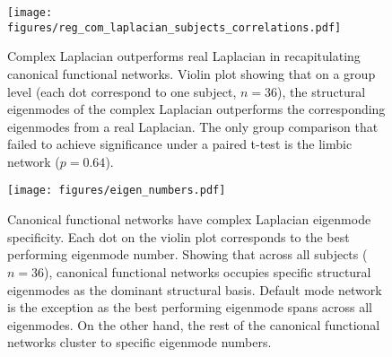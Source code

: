 \documentclass{article}
\begin{document}
\begin{figure}[ht]
\centering
\texttt{[image: figures/reg\_com\_laplacian\_subjects\_correlations.pdf]}
\caption{Complex Laplacian outperforms real Laplacian in recapitulating canonical functional networks. Violin plot showing that on a group level (each dot correspond to one subject, $n = 36$), the structural eigenmodes of the complex Laplacian outperforms the corresponding eigenmodes from a real Laplacian. The only group comparison that failed to achieve significance under a paired t-test is the limbic network ($p = 0.64$).}
\label{fig:fig7}
\end{figure}


\begin{figure}[ht]
\texttt{[image: figures/eigen\_numbers.pdf]}
\caption{Canonical functional networks have complex Laplacian eigenmode specificity. Each dot on the violin plot corresponds to the best performing eigenmode number. Showing that across all subjects ($n = 36$), canonical functional networks occupies specific structural eigenmodes as the dominant structural basis. Default mode network is the exception as the best performing eigenmode spans across all eigenmodes. On the other hand, the rest of the canonical functional networks cluster to specific eigenmode numbers.}
\label{fig:fig8}
\end{figure}
\end{document}
